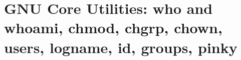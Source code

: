 
\chapter{GNU Core Utilities: who and whoami, chmod, chgrp, chown, users, logname, id, groups, pinky}

